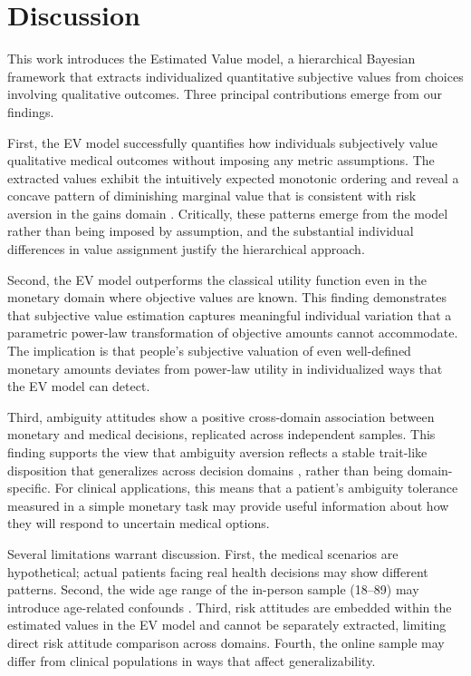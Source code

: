 \documentclass[11pt]{article}
\begin{document}
\section{Discussion}

This work introduces the Estimated Value model, a hierarchical Bayesian framework that extracts individualized quantitative subjective values from choices involving qualitative outcomes. Three principal contributions emerge from our findings.

First, the EV model successfully quantifies how individuals subjectively value qualitative medical outcomes without imposing any metric assumptions. The extracted values exhibit the intuitively expected monotonic ordering and reveal a concave pattern of diminishing marginal value that is consistent with risk aversion in the gains domain \citep{kahneman1979prospect, wakker2010prospect}. Critically, these patterns emerge from the model rather than being imposed by assumption, and the substantial individual differences in value assignment justify the hierarchical approach.

Second, the EV model outperforms the classical utility function even in the monetary domain where objective values are known. This finding demonstrates that subjective value estimation captures meaningful individual variation that a parametric power-law transformation of objective amounts cannot accommodate. The implication is that people's subjective valuation of even well-defined monetary amounts deviates from power-law utility in individualized ways that the EV model can detect.

Third, ambiguity attitudes show a positive cross-domain association between monetary and medical decisions, replicated across independent samples. This finding supports the view that ambiguity aversion reflects a stable trait-like disposition that generalizes across decision domains \citep{trautmann2015ambiguity, levy2010neural}, rather than being domain-specific. For clinical applications, this means that a patient's ambiguity tolerance measured in a simple monetary task may provide useful information about how they will respond to uncertain medical options.

Several limitations warrant discussion. First, the medical scenarios are hypothetical; actual patients facing real health decisions may show different patterns. Second, the wide age range of the in-person sample (18--89) may introduce age-related confounds \citep{tymula2013like}. Third, risk attitudes are embedded within the estimated values in the EV model and cannot be separately extracted, limiting direct risk attitude comparison across domains. Fourth, the online sample may differ from clinical populations in ways that affect generalizability.
\end{document}
